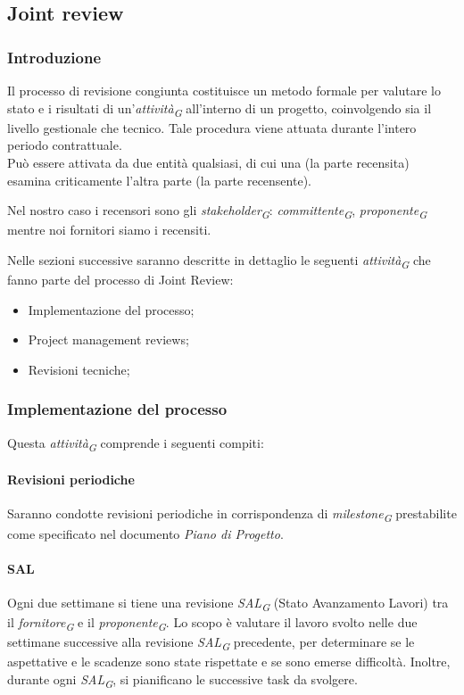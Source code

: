 \subsection{Joint review} 

\subsubsection{Introduzione}
Il processo di revisione congiunta costituisce un metodo formale per valutare lo stato e i risultati di un'\textit{attività}\textsubscript{\textit{G}} all'interno di un progetto, coinvolgendo sia il livello gestionale che tecnico. Tale procedura viene attuata durante l'intero periodo contrattuale. \\
Può essere attivata da due entità qualsiasi, di cui una (la parte recensita) esamina criticamente l'altra parte (la parte recensente).

Nel nostro caso i recensori sono gli \textit{stakeholder}\textsubscript{\textit{G}}: \textit{committente}\textsubscript{\textit{G}}, \textit{proponente}\textsubscript{\textit{G}} mentre noi fornitori siamo i recensiti.

Nelle sezioni successive saranno descritte in dettaglio le seguenti \textit{attività}\textsubscript{\textit{G}} che fanno parte del processo di Joint Review:
\begin{itemize}
    \item Implementazione del processo;
    \item Project management reviews;
    \item Revisioni tecniche;
\end{itemize}

\subsubsection{Implementazione del processo}
Questa \textit{attività}\textsubscript{\textit{G}} comprende i seguenti compiti: 

\paragraph{Revisioni periodiche}
Saranno condotte revisioni periodiche in corrispondenza di \textit{milestone}\textsubscript{\textit{G}} prestabilite come specificato nel documento \textit{Piano di Progetto}.

\paragraph{SAL}
Ogni due settimane si tiene una revisione \textit{SAL}\textsubscript{\textit{G}} (Stato Avanzamento Lavori) tra il \textit{fornitore}\textsubscript{\textit{G}} e il \textit{proponente}\textsubscript{\textit{G}}. Lo scopo è valutare il lavoro svolto nelle due settimane successive alla revisione \textit{SAL}\textsubscript{\textit{G}} precedente, per determinare se le aspettative e le scadenze sono state rispettate e se sono emerse difficoltà. Inoltre, durante ogni \textit{SAL}\textsubscript{\textit{G}}, si pianificano le successive task da svolgere.

